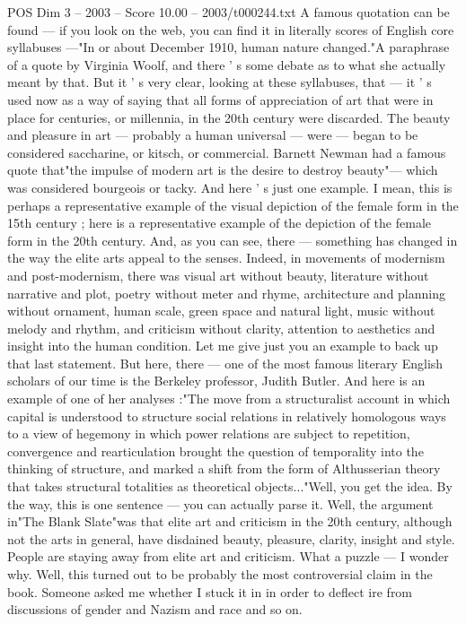 \begin{textsample}{POS Dim 3 – 2003 – Score 10.00 – 2003/t000244.txt}
A famous quotation can be found — if you look on the web, you can find it in literally scores of English core syllabuses —"In or about December 1910, human nature changed."A paraphrase of a quote by Virginia Woolf, and there ' s some debate as to what she actually meant by that.
But it ' s very clear, looking at these syllabuses, that — it ' s used now as a way of saying that all forms of appreciation of art that were in place for centuries, or millennia, in the 20th century were discarded.
The beauty and pleasure in art — probably a human universal — were — began to be considered saccharine, or kitsch, or commercial.
Barnett Newman had a famous quote that"the impulse of modern art is the desire to destroy beauty"— which was considered bourgeois or tacky.
And here ' s just one example.
I mean, this is perhaps a representative example of the visual depiction of the female form in the 15th century ; here is a representative example of the depiction of the female form in the 20th century.
And, as you can see, there — something has changed in the way the elite arts appeal to the senses.
Indeed, in movements of modernism and post-modernism, there was visual art without beauty, literature without narrative and plot, poetry without meter and rhyme, architecture and planning without ornament, human scale, green space and natural light, music without melody and rhythm, and criticism without clarity, attention to aesthetics and insight into the human condition.
Let me give just you an example to back up that last statement.
But here, there — one of the most famous literary English scholars of our time is the Berkeley professor, Judith Butler.
And here is an example of one of her analyses :"The move from a structuralist account in which capital is understood to structure social relations in relatively homologous ways to a view of hegemony in which power relations are subject to repetition, convergence and rearticulation brought the question of temporality into the thinking of structure, and marked a shift from the form of Althusserian theory that takes structural totalities as theoretical objects..."Well, you get the idea.
By the way, this is one sentence — you can actually parse it.
Well, the argument in"The Blank Slate"was that elite art and criticism in the 20th century, although not the arts in general, have disdained beauty, pleasure, clarity, insight and style.
People are staying away from elite art and criticism.
What a puzzle — I wonder why.
Well, this turned out to be probably the most controversial claim in the book.
Someone asked me whether I stuck it in in order to deflect ire from discussions of gender and Nazism and race and so on.

\end{textsample}
